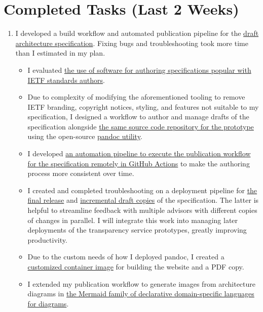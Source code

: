 \documentclass{jdf}
\begin{document}
\section*{Completed Tasks (Last 2 Weeks)}

\begin{enumerate}
    \item I developed a build workflow and automated publication pipeline for the \hyperlink{https://add-architecture-draft--conmotion.netlify.app/architecture.html}{draft architecture specification}. Fixing bugs and troubleshooting took more time than I estimated in my plan.
        \begin{itemize}
            \item I evaluated \hyperlink{https://github.com/martinthomson/i-d-template}{the use of software for authoring specifications popular with IETF standards authors}.
            \item Due to complexity of modifying the aforementioned tooling to remove IETF branding, copyright notices, styling, and features not suitable to my specification, I designed a workflow to author and manage drafts of the specification alongside \hyperlink{https://github.com/aj-stein/conmotion/}{the same source code repository for the prototype} using the open-source \hyperlink{https://pandoc.org/}{pandoc utility}.
            \item I developed \hyperlink{https://github.com/aj-stein/conmotion/blob/develop/.github/workflows/cd.yml}{an automation pipeline to execute the publication workflow for the specification remotely in GitHub Actions} to make the authoring process more consistent over time.
            \item I created and completed troubleshooting on a deployment pipeline for \hyperlink{https://aj-stein.github.io/conmotion/}{the final release} and \hyperlink{https://conmotion.netlify.app/}{incremental draft copies} of the specification. The latter is helpful to streamline feedback with multiple advisors with different copies of changes in parallel. I will integrate this work into managing later deployments of the transparency service prototypes, greatly improving productivity. 
            \item Due to the custom needs of how I deployed pandoc, I created a \hyperlink{https://github.com/users/aj-stein/packages/container/package/pandoc\%2Flatex}{customized container image} for building the website and a PDF copy.
            \item I extended my publication workflow to generate images from architecture diagrams in \hyperlink{https://mermaid.js.org/}{the Mermaid family of declarative domain-specific languages for diagrams}.

\end{itemize}
\end{enumerate}
\end{document}
